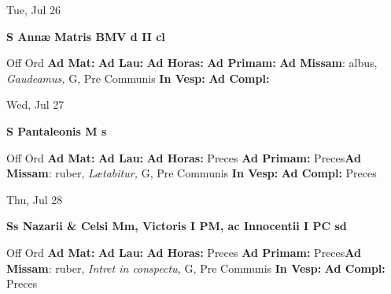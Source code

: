 \documentclass[10pt]{memoir}
\begin{document}
\begin{center}
\begin{minipage}{3.5in}
\vspace{2em}
\begin{center}Tue, Jul 26
\end{center}
\textbf{ \large S Annæ Matris BMV
\textnormal{\normalsize d II cl}}

\begin{justify}Off Ord
\textbf{Ad Mat: }
\textbf{Ad Lau: }
\textbf{Ad Horas: }
\textbf{Ad Primam: }\textbf{Ad Missam}: albus, \textit{Gaudeamus,} G, Pre Communis
\textbf{In Vesp: }
\textbf{Ad Compl: }
\end{justify}
\end{minipage}
\end{center}

\begin{center}
\begin{minipage}{3.5in}
\vspace{2em}
\begin{center}Wed, Jul 27
\end{center}
\textbf{ \large S Pantaleonis M
\textnormal{\normalsize s}}

\begin{justify}Off Ord
\textbf{Ad Mat: }
\textbf{Ad Lau: }
\textbf{Ad Horas: }Preces
\textbf{Ad Primam: }Preces\textbf{Ad Missam}: ruber, \textit{Lætabitur,} G, Pre Communis
\textbf{In Vesp: }
\textbf{Ad Compl: }Preces
\end{justify}
\end{minipage}
\end{center}

\begin{center}
\begin{minipage}{3.5in}
\vspace{2em}
\begin{center}Thu, Jul 28
\end{center}
\textbf{ \large Ss Nazarii \& Celsi Mm, Victoris I PM, ac Innocentii I PC
\textnormal{\normalsize sd}}

\begin{justify}Off Ord
\textbf{Ad Mat: }
\textbf{Ad Lau: }
\textbf{Ad Horas: }Preces
\textbf{Ad Primam: }Preces\textbf{Ad Missam}: ruber, \textit{Intret in conspectu,} G, Pre Communis
\textbf{In Vesp: }
\textbf{Ad Compl: }Preces
\end{justify}
\end{minipage}
\end{center}
\end{document}
